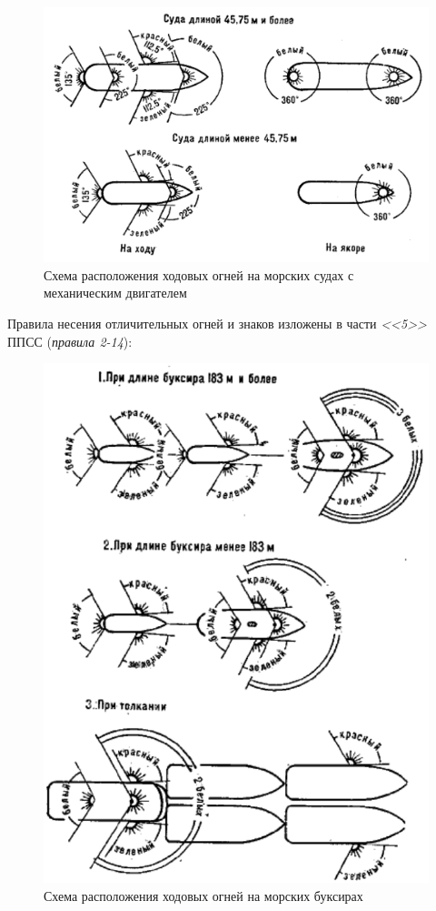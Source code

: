 \documentclass[a4paper, 12pt, twoside, final]{scrbook}
\begin{document}
\begin{figure}[htbp]
   \centering
   \includegraphics{pics/140_Ogni} %
   \caption{Схема расположения ходовых огней на морских судах с механическим двигателем}
   \label{fig:140}
\end{figure}

Правила несения отличительных огней и знаков изложены в части \textit{<<5>>} ППСС (\textit{правила 2-14}):

\begin{figure}[htbp]
   \centering
   \includegraphics{pics/141_Ogni} %
   \caption{Схема расположения ходовых огней на морских буксирах}
   \label{fig:141}
\end{figure}
\end{document}
